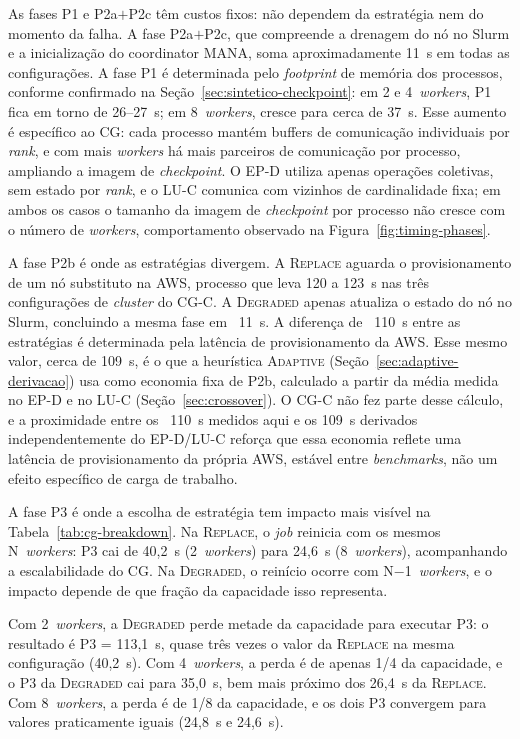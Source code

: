 As fases P1 e P2a$+$P2c têm custos fixos: não dependem da estratégia nem do momento
da falha. A fase P2a$+$P2c, que compreende a drenagem do nó no Slurm e a inicialização
do coordinator MANA, soma aproximadamente 11~s em todas as configurações. A fase P1 é
determinada pelo \textit{footprint} de memória dos processos, conforme confirmado na
Seção~\ref{sec:sintetico-checkpoint}: em 2 e 4~\textit{workers}, P1 fica em torno de
26--27~s; em 8~\textit{workers}, cresce para cerca de 37~s. Esse aumento é específico ao CG: cada processo mantém buffers de comunicação
individuais por \textit{rank}, e com mais \textit{workers} há mais parceiros de
comunicação por processo, ampliando a imagem de \textit{checkpoint}. O EP-D utiliza
apenas operações coletivas, sem estado por \textit{rank}, e o LU-C comunica com
vizinhos de cardinalidade fixa; em ambos os casos o tamanho da imagem de
\textit{checkpoint} por processo não cresce com o número de \textit{workers},
comportamento observado na Figura~\ref{fig:timing-phases}.

A fase P2b é onde as estratégias divergem. A \textsc{Replace} aguarda o
provisionamento de um nó substituto na AWS, processo que leva 120 a 123~s nas três
configurações de \textit{cluster} do CG-C. A \textsc{Degraded} apenas
atualiza o estado do nó no Slurm, concluindo a mesma fase em ~11~s. A diferença de
~110~s entre as estratégias é determinada pela latência de provisionamento da AWS.
Esse mesmo valor, cerca de 109~s, é o que a heurística \textsc{Adaptive}
(Seção~\ref{sec:adaptive-derivacao}) usa como economia fixa de P2b, calculado a
partir da média medida no EP-D e no LU-C (Seção~\ref{sec:crossover}). O CG-C não
fez parte desse cálculo, e a proximidade entre os ~110~s medidos aqui e os 109~s
derivados independentemente do EP-D/LU-C reforça que essa economia reflete uma
latência de provisionamento da própria AWS, estável entre \textit{benchmarks}, não
um efeito específico de carga de trabalho.

A fase P3 é onde a escolha de estratégia tem impacto mais visível na
Tabela~\ref{tab:cg-breakdown}. Na \textsc{Replace}, o \textit{job} reinicia com os
mesmos N~\textit{workers}: P3 cai de 40,2~s (2~\textit{workers}) para 24,6~s
(8~\textit{workers}), acompanhando a escalabilidade do CG. Na \textsc{Degraded}, o
reinício ocorre com N$-$1~\textit{workers}, e o impacto depende de que fração da
capacidade isso representa.

Com 2~\textit{workers}, a \textsc{Degraded} perde metade da capacidade para executar
P3: o resultado é P3 = 113,1~s, quase três vezes o valor da \textsc{Replace} na mesma
configuração (40,2~s). Com 4~\textit{workers}, a perda é de apenas 1/4 da capacidade,
e o P3 da \textsc{Degraded} cai para 35,0~s, bem mais próximo dos 26,4~s da
\textsc{Replace}. Com 8~\textit{workers}, a perda é de 1/8 da capacidade, e os dois
P3 convergem para valores praticamente iguais (24,8~s e 24,6~s).


